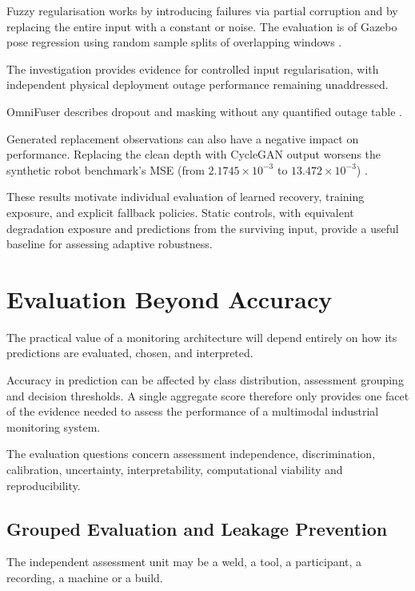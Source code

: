Fuzzy regularisation works by introducing failures via partial corruption and by replacing the
entire input with a constant or noise. The evaluation is of Gazebo pose regression using random
sample splits of overlapping windows \parencite[pp.~3--5]{altinses_deep_2023}.

The investigation provides evidence for controlled input regularisation, with independent physical
deployment outage performance remaining unaddressed.

OmniFuser describes dropout and masking without any quantified outage table \parencite[p.~10]{wang_omnifuser_2025}.

Generated replacement observations can also have a negative impact on performance. Replacing the
clean depth with CycleGAN output worsens the synthetic robot benchmark's MSE (from $2.1745 \times
10^{-3}$ to $13.472 \times 10^{-3}$) \parencite[Table~7]{altinses_performance_2025}.

These results motivate individual evaluation of learned recovery, training exposure, and explicit
fallback policies. Static controls, with equivalent degradation exposure and predictions from the
surviving input, provide a useful baseline for assessing adaptive robustness.

\section{Evaluation Beyond Accuracy}

The practical value of a monitoring architecture will depend entirely on how its predictions are
evaluated, chosen, and interpreted.

Accuracy in prediction can be affected by class distribution, assessment grouping and decision
thresholds. A single aggregate score therefore only provides one facet of the evidence needed to
assess the performance of a multimodal industrial monitoring system.

The evaluation questions concern assessment independence, discrimination, calibration, uncertainty, interpretability, computational viability and reproducibility.

\subsection{Grouped Evaluation and Leakage Prevention}

The independent assessment unit may be a weld, a tool, a participant, a recording, a machine or a
build.

